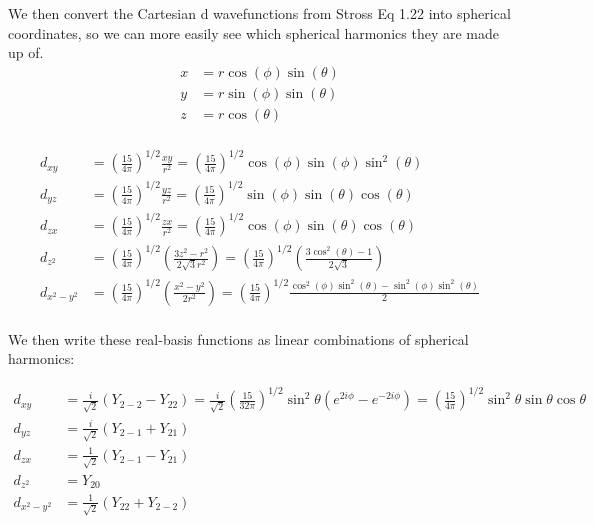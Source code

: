 \documentclass[10pt]{article} %
\begin{document}
We then convert the Cartesian d wavefunctions from Stross Eq 1.22 into spherical
coordinates, so we can more easily see which spherical harmonics they are made
up of.\\

\begin{align*}
  x &= r\cos(\phi)\sin(\theta)\\
  y &= r\sin(\phi)\sin(\theta)\\
  z &= r\cos(\theta)\\
\end{align*}

\begin{align*}
  d_{xy} &= \left(\frac{15}{4\pi}\right)^{1/2}\frac{xy}{r^2}
  = \left(\frac{15}{4\pi}\right)^{1/2}\cos(\phi)\sin(\phi)\sin^2(\theta)\\
  d_{yz} &= \left(\frac{15}{4\pi}\right)^{1/2}\frac{yz}{r^2}
  = \left(\frac{15}{4\pi}\right)^{1/2}\sin(\phi)\sin(\theta)\cos(\theta)\\
  d_{zx} &= \left(\frac{15}{4\pi}\right)^{1/2}\frac{zx}{r^2}
  = \left(\frac{15}{4\pi}\right)^{1/2}\cos(\phi)\sin(\theta)\cos(\theta)\\
  d_{z^2} &= \left(\frac{15}{4\pi}\right)^{1/2}
  \left(\frac{3z^2-r^2}{2\sqrt{3}r^2}\right)
  = \left(\frac{15}{4\pi}\right)^{1/2}
  \left(\frac{3\cos^2(\theta)-1}{2\sqrt{3}}\right)\\
  d_{x^2-y^2} &= \left(\frac{15}{4\pi}\right)^{1/2}
  \left(\frac{x^2-y^2}{2r^2}\right)
  = \left(\frac{15}{4\pi}\right)^{1/2}
  \frac{\cos^2(\phi)\sin^2(\theta)-\sin^2(\phi)\sin^2(\theta)}{2}\\
\end{align*}

We then write these real-basis functions as linear combinations of spherical harmonics:

\begin{align*}
  d_{xy} &= \frac{i}{\sqrt{2}}\left(Y_{2-2} - Y_{22}\right)
  = \frac{i}{\sqrt{2}}\left(\frac{15}{32\pi}\right)^{1/2}
  \sin^2\theta\left(e^{2i\phi}-e^{-2i\phi}\right)
  = \left(\frac{15}{4\pi}\right)^{1/2}\sin^2\theta\sin\theta\cos\theta\\
  d_{yz} &= \frac{i}{\sqrt{2}}\left(Y_{2-1}+Y_{21}\right)\\
  d_{zx} &= \frac{1}{\sqrt{2}}\left(Y_{2-1}-Y_{21}\right)\\
  d_{z^2} &= Y_{20}\\
  d_{x^2-y^2} &= \frac{1}{\sqrt{2}}\left(Y_{22} + Y_{2-2}\right)\\
\end{align*}
\end{document}
